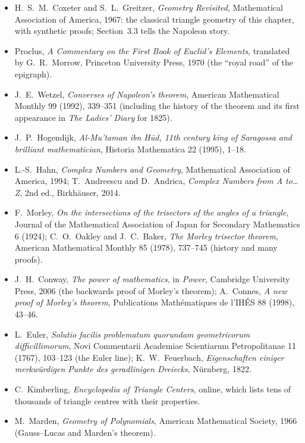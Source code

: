 \begin{itemize}
\item H.~S.~M.~Coxeter and S.~L.~Greitzer, \emph{Geometry Revisited}, Mathematical Association of America, 1967: the classical triangle
geometry of this chapter, with synthetic proofs; Section~3.3 tells the Napoleon story.
\item Proclus, \emph{A Commentary on the First Book of Euclid's Elements}, translated by G.~R.~Morrow, Princeton University Press, 1970
(the ``royal road'' of the epigraph).
\item J.~E.~Wetzel, \emph{Converses of Napoleon's theorem}, American Mathematical Monthly 99 (1992), 339--351 (including the history of the
theorem and its first appearance in \emph{The Ladies' Diary} for 1825).
\item J.~P.~Hogendijk, \emph{Al-Mu'taman ibn H\=ud, 11th century king of Saragossa and brilliant mathematician}, Historia Mathematica 22
(1995), 1--18.
\item L.-S.~Hahn, \emph{Complex Numbers and Geometry}, Mathematical Association of America, 1994; T.~Andreescu and D.~Andrica,
\emph{Complex Numbers from A to\dots Z}, 2nd ed., Birkh\"auser, 2014.
\item F.~Morley, \emph{On the intersections of the trisectors of the angles of a triangle}, Journal of the Mathematical Association of
Japan for Secondary Mathematics 6 (1924); C.~O.~Oakley and J.~C.~Baker, \emph{The Morley trisector theorem}, American Mathematical Monthly 85 (1978), 737--745 (history and
many proofs).
\item J.~H.~Conway, \emph{The power of mathematics}, in \emph{Power}, Cambridge University Press, 2006 (the backwards proof of Morley's
theorem); A.~Connes, \emph{A new proof of Morley's theorem}, Publications Math\'ematiques de l'IH\'ES 88 (1998), 43--46.
\item L.~Euler, \emph{Solutio facilis problematum quorundam geometricorum difficillimorum}, Novi Commentarii Academiae Scientiarum
Petropolitanae 11 (1767), 103--123 (the Euler line); K.~W.~Feuerbach, \emph{Eigenschaften einiger merkw\"urdigen Punkte des geradlinigen
Dreiecks}, N\"urnberg, 1822.
\item C.~Kimberling, \emph{Encyclopedia of Triangle Centers}, online, which lists tens of thousands of triangle centres with their
properties.
\item M.~Marden, \emph{Geometry of Polynomials}, American Mathematical Society, 1966 (Gauss--Lucas and Marden's theorem).
\end{itemize}
